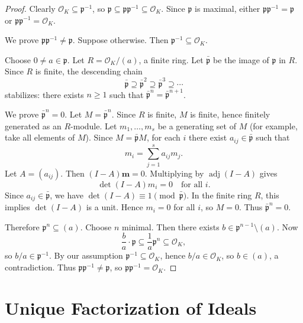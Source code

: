 \begin{proof}
Clearly \(\mathcal{O}_K \subseteq \mathfrak{p}^{-1}\), so \(\mathfrak{p} \subseteq \mathfrak{p} \mathfrak{p}^{-1} \subseteq \mathcal{O}_K\). Since \(\mathfrak{p}\) is maximal, either \(\mathfrak{p} \mathfrak{p}^{-1} = \mathfrak{p}\) or \(\mathfrak{p} \mathfrak{p}^{-1} = \mathcal{O}_K\).

We prove \(\mathfrak{p} \mathfrak{p}^{-1} \neq \mathfrak{p}\). Suppose otherwise. Then \(\mathfrak{p}^{-1} \subseteq \mathcal{O}_K\).

Choose \(0 \neq a \in \mathfrak{p}\). Let \(R = \mathcal{O}_K/(a)\), a finite ring. Let \(\bar{\mathfrak{p}}\) be the image of \(\mathfrak{p}\) in \(R\). Since \(R\) is finite, the descending chain
\[
\bar{\mathfrak{p}} \supseteq \bar{\mathfrak{p}}^2 \supseteq \bar{\mathfrak{p}}^3 \supseteq \cdots
\]
stabilizes: there exists \(n \ge 1\) such that \(\bar{\mathfrak{p}}^n = \bar{\mathfrak{p}}^{n+1}\).

We prove \(\bar{\mathfrak{p}}^n = 0\). Let \(M = \bar{\mathfrak{p}}^n\). Since \(R\) is finite, \(M\) is finite, hence finitely generated as an \(R\)-module. Let \(m_1, \dots, m_s\) be a generating set of \(M\) (for example, take all elements of \(M\)). Since \(M = \bar{\mathfrak{p}} M\), for each \(i\) there exist \(a_{ij} \in \bar{\mathfrak{p}}\) such that
\[
m_i = \sum_{j=1}^s a_{ij} m_j.
\]
Let \(A = (a_{ij})\). Then \((I - A)\mathbf{m} = 0\). Multiplying by \(\operatorname{adj}(I - A)\) gives
\[
\det(I - A) m_i = 0 \quad \text{for all } i.
\]
Since \(a_{ij} \in \bar{\mathfrak{p}}\), we have \(\det(I - A) \equiv 1 \pmod{\bar{\mathfrak{p}}}\). In the finite ring \(R\), this implies \(\det(I - A)\) is a unit. Hence \(m_i = 0\) for all \(i\), so \(M = 0\). Thus \(\bar{\mathfrak{p}}^n = 0\).

Therefore \(\mathfrak{p}^n \subseteq (a)\). Choose \(n\) minimal. Then there exists \(b \in \mathfrak{p}^{n-1} \setminus (a)\). Now
\[
\frac{b}{a} \cdot \mathfrak{p} \subseteq \frac{1}{a} \mathfrak{p}^n \subseteq \mathcal{O}_K,
\]
so \(b/a \in \mathfrak{p}^{-1}\). By our assumption \(\mathfrak{p}^{-1} \subseteq \mathcal{O}_K\), hence \(b/a \in \mathcal{O}_K\), so \(b \in (a)\), a contradiction. Thus \(\mathfrak{p} \mathfrak{p}^{-1} \neq \mathfrak{p}\), so \(\mathfrak{p} \mathfrak{p}^{-1} = \mathcal{O}_K\).
\end{proof}


\section{Unique Factorization of Ideals}

